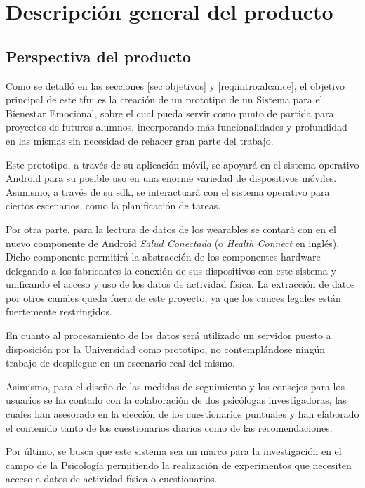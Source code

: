 \section{Descripción general del producto}
    \label{req:descripcion}

    \subsection{Perspectiva del producto}
        \label{req:descripcion:perspectiva}

        Como se detalló en las secciones \ref{sec:objetivos} y \ref{req:intro:alcance}, el objetivo principal de este \gls{tfm} es la creación de un prototipo de un Sistema para el Bienestar Emocional, sobre el cual pueda servir como punto de partida para proyectos de futuros alumnos, incorporando más funcionalidades y profundidad en las mismas sin necesidad de rehacer gran parte del trabajo. 

        Este prototipo, a través de su aplicación móvil, se apoyará en el sistema operativo Android para su posible uso en una enorme variedad de dispositivos móviles. Asimismo, a través de su \gls{sdk}, se interactuará con el sistema operativo para ciertos escenarios, como la planificación de tareas.

        Por otra parte, para la lectura de datos de los \glspl{wearable} se contará con en el nuevo componente de Android \textit{Salud Conectada} (o \textit{Health Connect} en inglés). Dicho componente permitirá la abstracción de los componentes hardware delegando a los fabricantes la conexión de sus dispositivos con este sistema y unificando el acceso y uso de los datos de actividad física. La extracción de datos por otros canales queda fuera de este proyecto, ya que los cauces legales están fuertemente restringidos. 

        En cuanto al procesamiento de los datos será utilizado un servidor puesto a disposición por la Universidad como prototipo, no contemplándose ningún trabajo de despliegue en un escenario real del mismo.

        Asimismo, para el diseño de las medidas de seguimiento y los consejos para los usuarios se ha contado con la colaboración de dos psicólogas investigadoras, las cuales han asesorado en la elección de los cuestionarios puntuales y han elaborado el contenido tanto de los cuestionarios diarios como de las recomendaciones. 
        
        Por último, se busca que este sistema sea un marco para la investigación en el campo de la Psicología permitiendo la realización de experimentos que necesiten acceso a datos de actividad física o cuestionarios.


